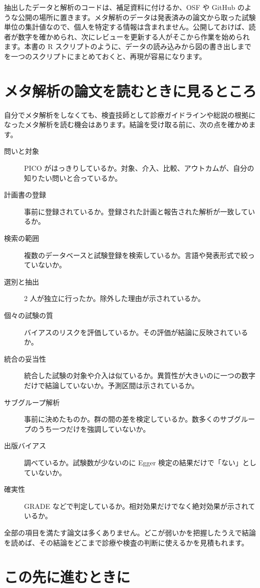 抽出したデータと解析のコードは、補足資料に付けるか、OSF や GitHub のような公開の場所に置きます。メタ解析のデータは発表済みの論文から取った試験単位の集計値なので、個人を特定する情報は含まれません。公開しておけば、読者が数字を確かめられ、次にレビューを更新する人がそこから作業を始められます。本書の R スクリプトのように、データの読み込みから図の書き出しまでを一つのスクリプトにまとめておくと、再現が容易になります。

\section{メタ解析の論文を読むときに見るところ}
\label{sec:08-5}

自分でメタ解析をしなくても、検査技師として診療ガイドラインや総説の根拠になったメタ解析を読む機会はあります。結論を受け取る前に、次の点を確かめます。

\begin{description}
\item[問いと対象] PICO がはっきりしているか。対象、介入、比較、アウトカムが、自分の知りたい問いと合っているか。
\item[計画書の登録] 事前に登録されているか。登録された計画と報告された解析が一致しているか。
\item[検索の範囲] 複数のデータベースと試験登録を検索しているか。言語や発表形式で絞っていないか。
\item[選別と抽出] 2 人が独立に行ったか。除外した理由が示されているか。
\item[個々の試験の質] バイアスのリスクを評価しているか。その評価が結論に反映されているか。
\item[統合の妥当性] 統合した試験の対象や介入は似ているか。異質性が大きいのに一つの数字だけで結論していないか。予測区間は示されているか。
\item[サブグループ解析] 事前に決めたものか。群の間の差を検定しているか。数多くのサブグループのうち一つだけを強調していないか。
\item[出版バイアス] 調べているか。試験数が少ないのに Egger 検定の結果だけで「ない」としていないか。
\item[確実性] GRADE などで判定しているか。相対効果だけでなく絶対効果が示されているか。
\end{description}

全部の項目を満たす論文は多くありません。どこが弱いかを把握したうえで結論を読めば、その結論をどこまで診療や検査の判断に使えるかを見積もれます。

\section{\hatten この先に進むときに}
\label{sec:08-6}

